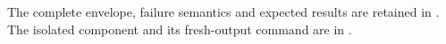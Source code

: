 \begingroup\raggedright
The complete envelope, failure semantics and expected results are retained in
. The isolated
component and its fresh-output command are in
.
\par\endgroup
